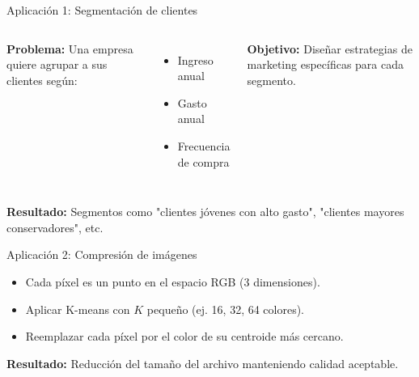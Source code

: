 \documentclass[aspectratio=169]{beamer}
\begin{document}
\begin{frame}{Aplicación 1: Segmentación de clientes}
    \begin{columns}
        \textbf{Problema:} Una empresa quiere agrupar a sus clientes según:
        \begin{itemize}
            \item Ingreso anual
            \item Gasto anual
            \item Frecuencia de compra
        \end{itemize}
        
        \textbf{Objetivo:} Diseñar estrategias de marketing específicas para cada segmento.
        
    \end{columns}
    
    \textbf{Resultado:} Segmentos como "clientes jóvenes con alto gasto", "clientes mayores conservadores", etc.
\end{frame}

\begin{frame}{Aplicación 2: Compresión de imágenes}
    \begin{itemize}
        \item Cada píxel es un punto en el espacio RGB (3 dimensiones).
        \item Aplicar K-means con \(K\) pequeño (ej. 16, 32, 64 colores).
        \item Reemplazar cada píxel por el color de su centroide más cercano.
    \end{itemize}
    
    \begin{center}
    \end{center}
    
    \textbf{Resultado:} Reducción del tamaño del archivo manteniendo calidad aceptable.
\end{frame}
\end{document}
